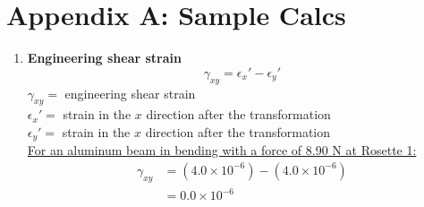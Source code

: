 \section*{Appendix A: Sample Calcs}

\begin{enumerate}[wide,label=\textbf{\arabic*}., labelindent=0pt]

    \item \textbf{Engineering shear strain}
        \[\gamma_{xy} = \epsilon_x' - \epsilon_y'\]
        $\gamma_{xy} =$ engineering shear strain\\
        $\epsilon_x' =$ strain in the $x$ direction after the transformation\\
        $\epsilon_y' =$ strain in the $x$ direction after the transformation\\
        
        \underline{For an aluminum beam in bending with a force of 8.90 N at Rosette 1:} \\
        \begin{align*}
            \gamma_{xy} &= (4.0 \times 10^{-6}) - (4.0 \times 10^{-6})\\
            &= 0.0 \times 10^{-6}\\
        \end{align*}
        
\end{enumerate}